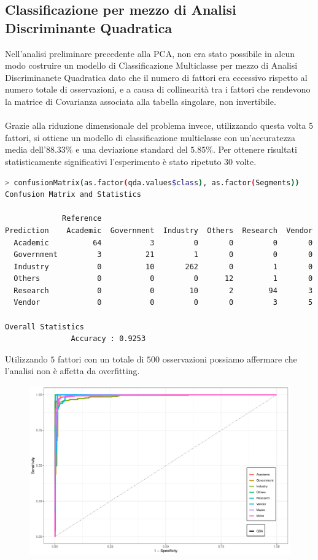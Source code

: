 \documentclass[11pt,a4paper]{article}
\begin{document}
\subsection{Classificazione per mezzo di Analisi Discriminante Quadratica}
Nell'analisi preliminare precedente alla PCA, non era stato possibile in alcun
modo costruire un modello di Classificazione Multiclasse per mezzo di Analisi
Discriminanete Quadratica dato che il numero di fattori era eccessivo rispetto
al numero totale di osservazioni, e a causa di collinearit\`a tra i fattori che
rendevono la matrice di Covarianza associata alla tabella singolare, non
invertibile.\\
\\
Grazie alla riduzione dimensionale del problema invece, utilizzando questa volta
$5$ fattori, si ottiene un modello di classificazione multiclasse con
un'accuratezza media dell'$88.33\%$ e una deviazione standard del $5.85\%$.
Per ottenere risultati statisticamente significativi l'esperimento \`e stato
ripetuto $30$ volte.
\begin{lstlisting}[language=bash,basicstyle=\scriptsize,tabsize=2,frame = single]
> confusionMatrix(as.factor(qda.values$class), as.factor(Segments))
Confusion Matrix and Statistics

             Reference
Prediction    Academic  Government  Industry  Others  Research  Vendor
  Academic          64           3         0       0         0       0
  Government         3          21         1       0         0       0
  Industry           0          10       262       0         1       0
  Others             0           0         0      12         1       0
  Research           0           0        10       2        94       3
  Vendor             0           0         0       0         3       5

Overall Statistics
               Accuracy : 0.9253
\end{lstlisting}
Utilizzando $5$ fattori con un totale di $500$ osservazioni possiamo affermare
che l'analisi non \`e affetta da overfitting.
\clearpage
\begin{figure}[H]
	\vspace{-1.0cm}
	\hspace{-0.5cm}
	\includegraphics[scale=.60]{imgs/QDA_ggplot.pdf}
\end{figure}
\end{document}
